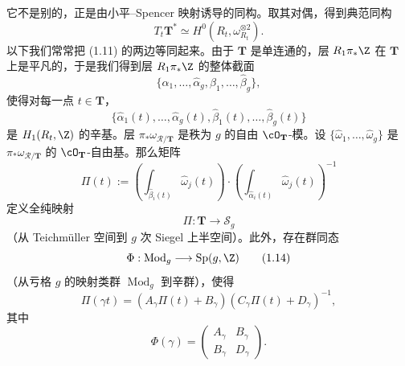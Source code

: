 它不是别的，正是由小平–Spencer 映射诱导的同构。取其对偶，得到典范同构
\begin{equation}
  T_t\mathbf{T}^*\simeq H^0(R_t,\omega_{R_t}^{\otimes 2}). \tag{1.11}
\end{equation}
以下我们常常把 (1.11) 的两边等同起来。由于 $\mathbf{T}$ 是单连通的，层 $R_1\pi_*\Z$ 在 $\mathbf{T}$ 上是平凡的，于是我们得到层 $R_1\pi_*\Z$ 的整体截面
\[
  \{\hat\alpha_1,\dots,\hat\alpha_g,\hat\beta_1,\dots,\hat\beta_g\},
\]
使得对每一点 $t\in\mathbf{T}$，
\[
  \{\hat\alpha_1(t),\dots,\hat\alpha_g(t),\hat\beta_1(t),\dots,\hat\beta_g(t)\}
\]
是 $H_1(R_t,\Z)$ 的辛基。层 $\pi_*\omega_{\mathcal{R}/\mathbf{T}}$ 是秩为 $g$ 的自由 $\cO_{\mathbf{T}}$-模。设 $\{\hat\omega_1,\dots,\hat\omega_g\}$ 是 $\pi_*\omega_{\mathcal{R}/\mathbf{T}}$ 的 $\cO_{\mathbf{T}}$-自由基。那么矩阵
\begin{equation}
  \Pi(t):=\left(\int_{\hat\beta_i(t)}\hat\omega_j(t)\right)\cdot
  \left(\int_{\hat\alpha_i(t)}\hat\omega_j(t)\right)^{-1} \tag{1.12}
\end{equation}
定义全纯映射
\begin{equation}
  \Pi:\mathbf{T}\longrightarrow\mathscr{S}_g \tag{1.13}
\end{equation}
（从 Teichmüller 空间到 $g$ 次 Siegel 上半空间）。此外，存在群同态
\begin{equation}
  \Phi:\operatorname{Mod}_g\longrightarrow \operatorname{Sp}(g,\Z) \tag{1.14}
\end{equation}
（从亏格 $g$ 的映射类群 $\operatorname{Mod}_g$ 到辛群），使得
\begin{equation}
  \Pi(\gamma t)=(A_\gamma\Pi(t)+B_\gamma)(C_\gamma\Pi(t)+D_\gamma)^{-1}, \tag{1.15}
\end{equation}
其中
\begin{equation}
  \Phi(\gamma)=
  \begin{pmatrix}
    A_\gamma & B_\gamma\\ B_\gamma & D_\gamma
  \end{pmatrix}. \tag{1.16}
\end{equation}

